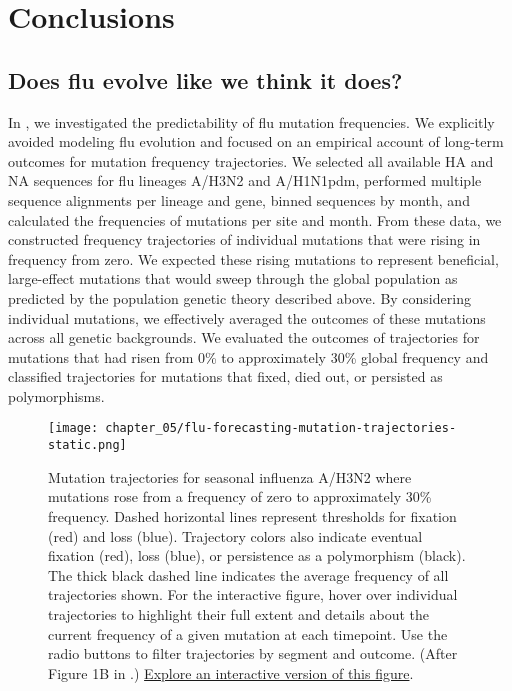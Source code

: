 \chapter{Conclusions}

\section{Does flu evolve like we think it does?}

In \citet{Barrat-Charlaix2020}, we investigated the predictability of flu mutation frequencies.
We explicitly avoided modeling flu evolution and focused on an empirical account of long-term outcomes for mutation frequency trajectories.
We selected all available HA and NA sequences for flu lineages A/H3N2 and A/H1N1pdm, performed multiple sequence alignments per lineage and gene, binned sequences by month, and calculated the frequencies of mutations per site and month.
From these data, we constructed frequency trajectories of individual mutations that were rising in frequency from zero.
We expected these rising mutations to represent beneficial, large-effect mutations that would sweep through the global population as predicted by the population genetic theory described above.
By considering individual mutations, we effectively averaged the outcomes of these mutations across all genetic backgrounds.
We evaluated the outcomes of trajectories for mutations that had risen from 0\% to approximately 30\% global frequency and classified trajectories for mutations that fixed, died out, or persisted as polymorphisms.

\begin{figure}
  \centering
  \texttt{[image: chapter\_05/flu-forecasting-mutation-trajectories-static.png]}
  \caption{Mutation trajectories for seasonal influenza A/H3N2 where mutations rose from a frequency of zero to approximately 30\% frequency.
    Dashed horizontal lines represent thresholds for fixation (red) and loss (blue).
    Trajectory colors also indicate eventual fixation (red), loss (blue), or persistence as a polymorphism (black).
    The thick black dashed line indicates the average frequency of all trajectories shown.
    For the interactive figure, hover over individual trajectories to highlight their full extent and details about the current frequency of a given mutation at each timepoint.
    Use the radio buttons to filter trajectories by segment and outcome.
    (After Figure 1B in \citet{Barrat-Charlaix2020}.)
    \href{https://bedford.io/blog/predicting-seasonal-influenza-evolution/}{Explore an interactive version of this figure}.\label{fig:mutation-trajectories} }
\end{figure}

